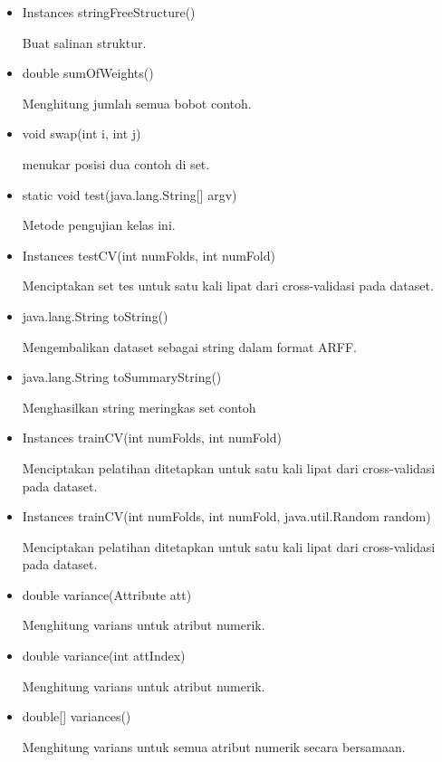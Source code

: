 \begin{itemize}
	\item Instances stringFreeStructure()
	
	Buat salinan struktur. 
	
	\item double sumOfWeights()
	
	Menghitung jumlah semua bobot contoh.
	
	\item void swap(int i, int j)
	
	menukar posisi dua contoh di set.
	
	\item static void test(java.lang.String[] argv)
	
	Metode pengujian kelas ini.
	
	\item Instances testCV(int numFolds, int numFold)
	
	Menciptakan set tes untuk satu kali lipat dari cross-validasi pada dataset.
	
	\item java.lang.String toString()
	
	Mengembalikan dataset sebagai string dalam format ARFF.
	
	\item java.lang.String toSummaryString()
	
	Menghasilkan string meringkas set contoh
	
	\item Instances trainCV(int numFolds, int numFold)
	
	Menciptakan pelatihan ditetapkan untuk satu kali lipat dari cross-validasi pada dataset.
	
	\item Instances trainCV(int numFolds, int numFold, java.util.Random random)
	
	Menciptakan pelatihan ditetapkan untuk satu kali lipat dari cross-validasi pada dataset.
	
	\item double variance(Attribute att)
	
	Menghitung varians untuk atribut numerik.
	
	\item double variance(int attIndex)
	
	Menghitung varians untuk atribut numerik.
	
	\item double[] variances()
	
	Menghitung varians untuk semua atribut numerik secara bersamaan.
\end{itemize}

